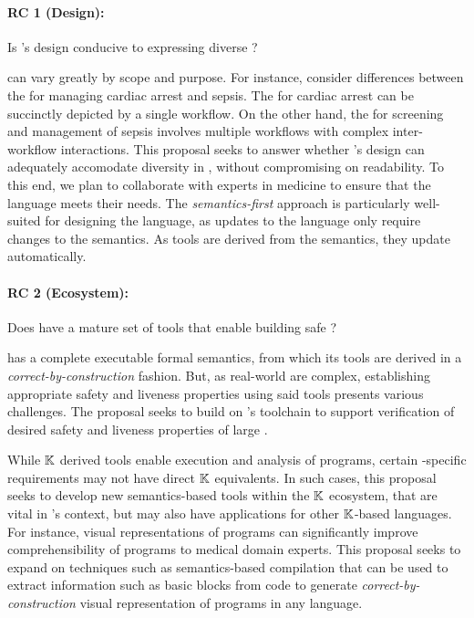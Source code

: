 \paragraph{RC 1 (Design):} Is \MediK{}'s design conducive to expressing diverse \BPGs{}?

\BPGs{} can vary greatly by scope and purpose. For instance,
consider differences between the \BPGs{} for managing cardiac
arrest and sepsis. The \BPG{} for cardiac arrest can be
succinctly depicted by a single workflow. On the other hand, the \BPG{} for
screening and management of sepsis involves multiple workflows with complex
inter-workflow interactions.
This proposal seeks to answer whether \MediK{}'s
design can adequately accomodate diversity in \BPGs{}, without
compromising on readability. To this end, we plan to collaborate with
experts in medicine to ensure that the language meets their needs.
The \emph{semantics-first} approach is particularly
well-suited for designing the language, as updates to the language
only require changes to the semantics. As tools are derived from the semantics,
they update automatically.

\paragraph{RC 2 (Ecosystem):} Does \MediK{} have a mature
set of tools that enable building safe \CDSSs{}?

\MediK{} has a complete executable formal semantics, from which
its tools are derived in a \emph{correct-by-construction} fashion.
But, as real-world \BPGs{} are complex, establishing appropriate safety and liveness properties using
said tools presents various challenges. The proposal seeks to build on
\MediK{}'s toolchain to support verification of desired safety and liveness
properties of large \BPGs{}.

While $\mathbb{K}$ derived tools enable execution and analysis of \MediK{} programs,
certain \BPG{}-specific requirements may not have direct $\mathbb{K}{}$ equivalents.
In such cases, this proposal seeks to develop new semantics-based tools within
the $\mathbb{K}{}$ ecosystem, that are vital in \MediK's context, but may also have
applications for other $\mathbb{K}$-based languages.
For instance, visual representations of \MediK{} programs can
significantly improve comprehensibility of \MediK{} programs to medical domain
experts. This proposal seeks to expand on techniques
such as semantics-based compilation that can be used to extract information such
as basic blocks from code to generate \emph{correct-by-construction} visual
representation of programs in any language.

